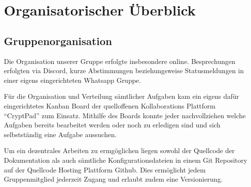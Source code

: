 \section{Organisatorischer Überblick}

\subsection{Gruppenorganisation}


Die Organisation unserer Gruppe erfolgte insbesondere online. Besprechungen erfolgten via Discord, kurze Abstimmungen beziehungsweise Statusmeldungen in einer eigens eingerichteten Whatsapp Gruppe.

Für die Organisation und Verteilung sämtlicher Aufgaben kam ein eigens dafür eingerichtetes Kanban Board der quelloffenen Kollaborations Plattform \enquote{CryptPad} zum Einsatz. Mithilfe des Boards konnte jeder nachvollziehen welche Aufgaben bereits bearbeitet werden oder noch zu erledigen sind und sich selbstständig eine Aufgabe aussuchen.

Um ein dezentrales Arbeiten zu ermgöglichen liegen sowohl der Quellcode der Dokumentation als auch sämtliche Konfigurationsdateien in einem Git Repository auf der Quellcode Hosting Plattform Github. Dies ermöglicht jedem Gruppenmitglied jederzeit Zugang und erlaubt zudem eine Versionierung.